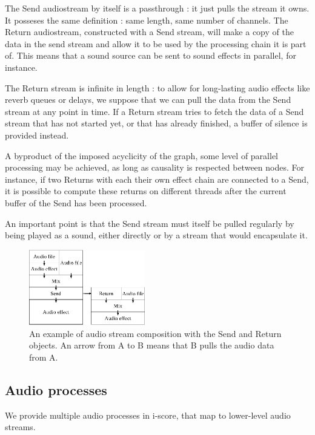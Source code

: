 \documentclass{article}
\begin{document}
The Send audiostream by itself is a passthrough : it just pulls the stream it owns.
It posseses the same definition : same length, same number of channels.
The Return audiostream, constructed with a Send stream, will make a copy of the data in 
the send stream and allow it to be used by the processing chain it is part of.
This means that a sound source can be sent to sound effects in parallel, for instance.

The Return stream is infinite in length : to allow for long-lasting audio effects 
like reverb queues or delays, we suppose that we can pull the data from the Send stream at any point in time.
If a Return stream tries to fetch the data of a Send stream that has not started yet, or that has already finished, a buffer of silence is provided instead.

A byproduct of the imposed acyclicity of the graph, some level of parallel processing may be achieved, as long as causality is respected between nodes. 
For instance, if two Returns with each their own effect chain are connected to a Send, it is possible to compute these returns on different threads after the current buffer of the Send has been processed.

An important point is that the Send stream must itself be pulled regularly by being played as a sound, either directly or by a stream that would encapsulate it.

\begin{figure}
	\centering
	\includegraphics[width=0.45\textwidth]{figures/graph2.eps}
	\caption{An example of audio stream composition with the Send and Return objects. An arrow from A to B means that B pulls the audio data from A.}
	\label{fig.mixsendreturn}
\end{figure}

\subsection{Audio processes}
\label{sec.processes}
We provide multiple audio processes in i-score, that map 
to lower-level audio streams.
\end{document}
